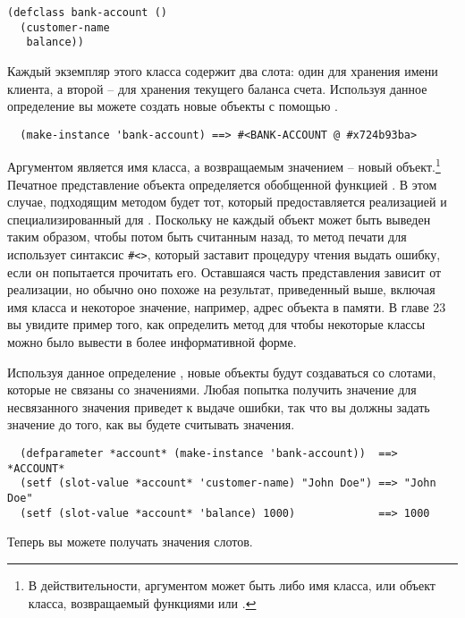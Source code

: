 \begin{lstlisting}
(defclass bank-account ()
  (customer-name
   balance))
\end{lstlisting}

Каждый экземпляр этого класса содержит два слота: один для хранения имени клиента, а
второй -- для хранения текущего баланса счета.  Используя данное определение вы можете
создать новые объекты  с помощью .

\begin{verbatim}
  (make-instance 'bank-account) ==> #<BANK-ACCOUNT @ #x724b93ba>
\end{verbatim}

Аргументом  является имя класса, а возвращаемым значением -- новый
объект.\footnote{В действительности, аргументом  может быть либо имя
  класса, или объект класса, возвращаемый функциями  или
  .}  Печатное представление объекта определяется обобщенной функцией
.  В этом случае, подходящим методом будет тот, который предоставляется
реализацией и специализированный для .  Поскольку не каждый объект
может быть выведен таким образом, чтобы потом быть считанным назад, то метод печати для
 использует синтаксис \lstinline!#<>!, который заставит процедуру
чтения выдать ошибку, если он попытается прочитать его.  Оставшаяся часть представления
зависит от реализации, но обычно оно похоже на результат, приведенный выше, включая имя
класса и некоторое значение, например, адрес объекта в памяти.  В главе 23 вы увидите
пример того, как определить метод для  чтобы некоторые классы можно
было вывести в более информативной форме.

Используя данное определение , новые объекты будут создаваться со
слотами, которые не связаны со значениями.  Любая попытка получить значение для
несвязанного значения приведет к выдаче ошибки, так что вы должны задать значение до того,
как вы будете считывать значения.

\begin{verbatim}
  (defparameter *account* (make-instance 'bank-account))  ==> *ACCOUNT*
  (setf (slot-value *account* 'customer-name) "John Doe") ==> "John Doe"
  (setf (slot-value *account* 'balance) 1000)             ==> 1000
\end{verbatim}

Теперь вы можете получать значения слотов.

